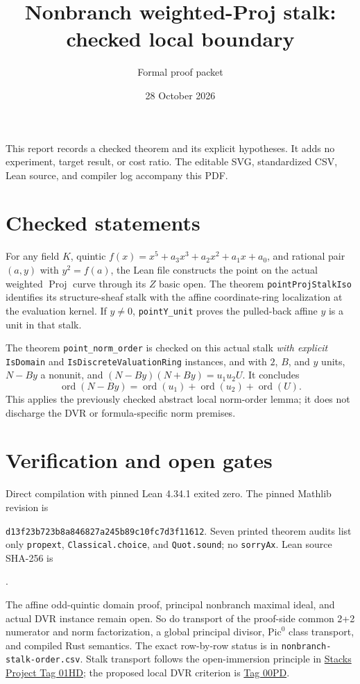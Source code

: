 \documentclass[11pt]{article}
\title{Nonbranch weighted-Proj stalk: checked local boundary}
\author{Formal proof packet}
\date{28 October 2026}
\begin{document}
\maketitle
\noindent This report records a checked theorem and its explicit hypotheses. It adds no experiment, target result, or cost ratio. The editable SVG, standardized CSV, Lean source, and compiler log accompany this PDF.

\section*{Checked statements}
For any field $K$, quintic $f(x)=x^5+a_3x^3+a_2x^2+a_1x+a_0$, and rational pair $(a,y)$ with $y^2=f(a)$, the Lean file constructs the point on the actual weighted $\operatorname{Proj}$ curve through its $Z$ basic open. The theorem \texttt{pointProjStalkIso} identifies its structure-sheaf stalk with the affine coordinate-ring localization at the evaluation kernel. If $y\ne0$, \texttt{pointY\_unit} proves the pulled-back affine $y$ is a unit in that stalk.

The theorem \texttt{point\_norm\_order} is checked on this actual stalk \emph{with explicit} \texttt{IsDomain} and \texttt{IsDiscreteValuationRing} instances, and with $2$, $B$, and $y$ units, $N-By$ a nonunit, and $(N-By)(N+By)=u_1u_2U$. It concludes
\[
  \operatorname{ord}(N-By)=\operatorname{ord}(u_1)+\operatorname{ord}(u_2)+\operatorname{ord}(U).
\]
This applies the previously checked abstract local norm-order lemma; it does not discharge the DVR or formula-specific norm premises.

\section*{Verification and open gates}
Direct compilation with pinned Lean 4.34.1 exited zero. The pinned Mathlib revision is
\par\noindent\texttt{d13f23b723b8a846827a245b89c10fc7d3f11612}.
Seven printed theorem audits list only \texttt{propext}, \texttt{Classical.choice}, and \texttt{Quot.sound}; no \texttt{sorryAx}. Lean source SHA-256 is
\par{}.

The affine odd-quintic domain proof, principal nonbranch maximal ideal, and actual DVR instance remain open. So do transport of the proof-side common 2+2 numerator and norm factorization, a global principal divisor, $\mathrm{Pic}^0$ class transport, and compiled Rust semantics. The exact row-by-row status is in \texttt{nonbranch-stalk-order.csv}. Stalk transport follows the open-immersion principle in \href{https://stacks.math.columbia.edu/tag/01HD}{Stacks Project Tag 01HD}; the proposed local DVR criterion is \href{https://stacks.math.columbia.edu/tag/00PD}{Tag 00PD}.
\end{document}
